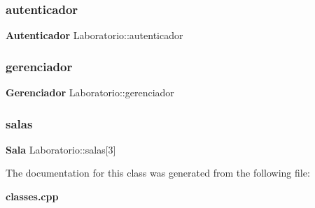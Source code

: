 \subsubsection{autenticador}
{\footnotesize\ttfamily \textbf{ Autenticador} Laboratorio\+::autenticador}

\mbox{\label{class_laboratorio_a5136b1e8ee1e2310316512714bc7bbe5}} 
\subsubsection{gerenciador}
{\footnotesize\ttfamily \textbf{ Gerenciador} Laboratorio\+::gerenciador}

\mbox{\label{class_laboratorio_a59b948322d3d7a957c9e38d0c0a8a3a6}} 
\subsubsection{salas}
{\footnotesize\ttfamily \textbf{ Sala} Laboratorio\+::salas[3]}



The documentation for this class was generated from the following file\+:\begin{DoxyCompactItemize}
\item 
\textbf{ classes.\+cpp}\end{DoxyCompactItemize}

